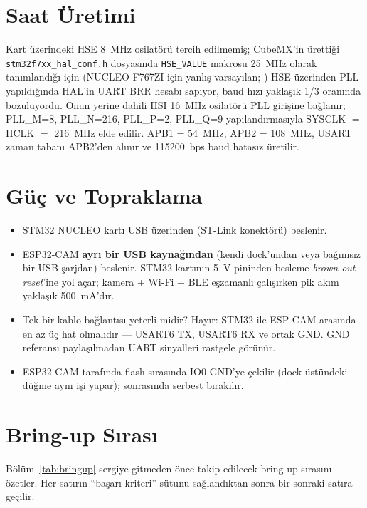 \section{Saat Üretimi}

Kart üzerindeki HSE 8~MHz osilatörü tercih edilmemiş; CubeMX'in ürettiği
\texttt{stm32f7xx\_hal\_conf.h} dosyasında \texttt{HSE\_VALUE} makrosu
25~MHz olarak tanımlandığı için (NUCLEO-F767ZI için yanlış varsayılan;
\cite{stm32f767_rm}) HSE üzerinden PLL yapıldığında HAL'in UART BRR
hesabı sapıyor, baud hızı yaklaşık 1/3 oranında bozuluyordu. Onun yerine dahili HSI 16~MHz
osilatörü PLL girişine bağlanır; PLL\_M=8, PLL\_N=216, PLL\_P=2,
PLL\_Q=9 yapılandırmasıyla SYSCLK $=$ HCLK $=$ 216~MHz elde edilir.
APB1 = 54~MHz, APB2 = 108~MHz, USART zaman tabanı APB2'den alınır ve
115200~bps baud hatasız üretilir.

\section{Güç ve Topraklama}

\begin{itemize}
    \item STM32 NUCLEO kartı USB üzerinden (ST-Link konektörü) beslenir.
    \item ESP32-CAM \textbf{ayrı bir USB kaynağından} (kendi dock'undan
          veya bağımsız bir USB şarjdan) beslenir. STM32 kartının 5~V
          pininden besleme \emph{brown-out reset}'ine yol açar; kamera +
          Wi-Fi + BLE eşzamanlı çalışırken pik akım yaklaşık 500~mA'dır.
    \item Tek bir kablo bağlantısı yeterli midir? Hayır: STM32 ile ESP-CAM
          arasında en az üç hat olmalıdır --- USART6 TX, USART6 RX ve
          ortak GND. GND referansı paylaşılmadan UART sinyalleri rastgele
          görünür.
    \item ESP32-CAM tarafında flash sırasında IO0 GND'ye çekilir
          (dock üstündeki düğme aynı işi yapar); sonrasında serbest
          bırakılır.
\end{itemize}

\section{Bring-up Sırası}

Bölüm~\ref{tab:bringup} sergiye gitmeden önce takip edilecek bring-up sırasını
özetler. Her satırın ``başarı kriteri'' sütunu sağlandıktan sonra bir
sonraki satıra geçilir.

